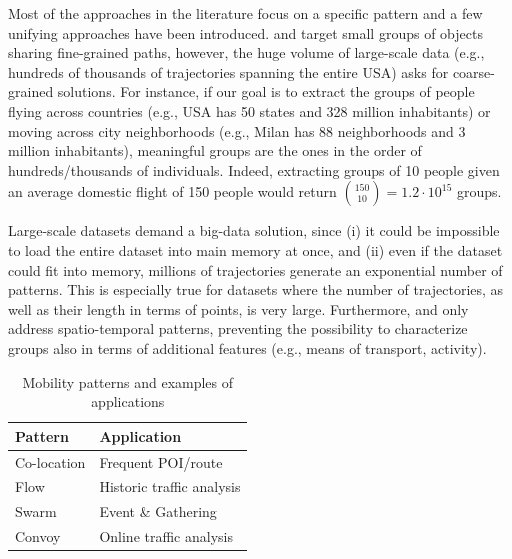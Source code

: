 \documentclass[
]{ceurart}
\begin{document}
Most of the approaches in the literature focus on a specific pattern and a few unifying approaches have been introduced.
\cite{DBLP:journals/ijitdm/PhanPT16} and \cite{DBLP:journals/pvldb/FanZWT16} target small groups of objects sharing fine-grained paths, however, the huge volume of large-scale data (e.g., hundreds of thousands of trajectories spanning the entire USA) asks for coarse-grained solutions.
For instance, if our goal is to extract the groups of people flying across countries (e.g., USA has 50 states and 328 million inhabitants) or moving across city neighborhoods (e.g., Milan has 88 neighborhoods and 3 million inhabitants), meaningful groups are the ones in the order of hundreds/thousands of individuals. 
Indeed, extracting groups of 10 people given an average domestic flight of 150 people would return $\binom{150}{10} = 1.2 \cdot 10^{15}$ groups.

Large-scale datasets demand a big-data solution, since (i) it could be impossible to load the entire dataset into main memory at once, and (ii) even if the dataset could fit into memory, millions of trajectories generate an exponential number of patterns.
This is especially true for datasets where the number of trajectories, as well as their length in terms of points, is very large.
Furthermore, \cite{DBLP:journals/ijitdm/PhanPT16} and \cite{DBLP:journals/pvldb/FanZWT16} only address spatio-temporal patterns, preventing the possibility to characterize groups also in terms of additional features (e.g., means of transport, activity).

\begin{table}[t]
\centering
\scriptsize
\caption{Mobility patterns and examples of applications}

\label{tab:proximitypattern}
\begin{tabular}{ll}
\toprule
Pattern                                           & Application \\
\midrule
Co-location \citep{bao2021mining} & Frequent POI/route    \\
Flow \citep{DBLP:journals/tmc/HanLO15}             & Historic traffic analysis\\
Swarm \citep{DBLP:journals/pvldb/LiDHK10}          & Event \& Gathering\\ %
Convoy \citep{DBLP:journals/pvldb/JeungYZJS08}         & Online traffic analysis\\%
\bottomrule
\end{tabular}%
\end{table}
\end{document}
